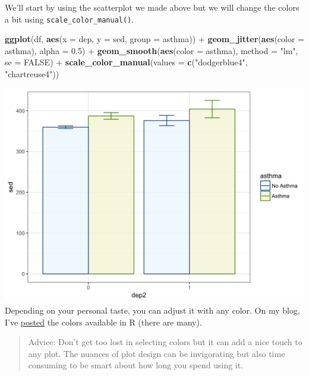 \documentclass[]{tufte-book}
\newenvironment{Shaded}{}{}
\newcommand{\KeywordTok}[1]{\textcolor[rgb]{0.00,0.44,0.13}{\textbf{#1}}}
\newcommand{\DataTypeTok}[1]{\textcolor[rgb]{0.56,0.13,0.00}{#1}}
\newcommand{\FloatTok}[1]{\textcolor[rgb]{0.25,0.63,0.44}{#1}}
\newcommand{\StringTok}[1]{\textcolor[rgb]{0.25,0.44,0.63}{#1}}
\newcommand{\OtherTok}[1]{\textcolor[rgb]{0.00,0.44,0.13}{#1}}
\newcommand{\OperatorTok}[1]{\textcolor[rgb]{0.40,0.40,0.40}{#1}}
\newcommand{\NormalTok}[1]{#1}
\theoremstyle{definition}
\theoremstyle{definition}
\theoremstyle{remark}
\begin{document}
We'll start by using the scatterplot we made above but we will change
the colors a bit using \texttt{scale\_color\_manual()}.

\begin{Shaded}
\begin{Highlighting}[]
\KeywordTok{ggplot}\NormalTok{(df, }\KeywordTok{aes}\NormalTok{(}\DataTypeTok{x =}\NormalTok{ dep, }\DataTypeTok{y =}\NormalTok{ sed, }\DataTypeTok{group =}\NormalTok{ asthma)) }\OperatorTok{+}\StringTok{ }
\StringTok{    }\KeywordTok{geom_jitter}\NormalTok{(}\KeywordTok{aes}\NormalTok{(}\DataTypeTok{color =}\NormalTok{ asthma), }\DataTypeTok{alpha =} \FloatTok{0.5}\NormalTok{) }\OperatorTok{+}\StringTok{ }
\StringTok{    }\KeywordTok{geom_smooth}\NormalTok{(}\KeywordTok{aes}\NormalTok{(}\DataTypeTok{color =}\NormalTok{ asthma), }\DataTypeTok{method =} \StringTok{"lm"}\NormalTok{, }
        \DataTypeTok{se =} \OtherTok{FALSE}\NormalTok{) }\OperatorTok{+}\StringTok{ }\KeywordTok{scale_color_manual}\NormalTok{(}\DataTypeTok{values =} \KeywordTok{c}\NormalTok{(}\StringTok{"dodgerblue4"}\NormalTok{, }
    \StringTok{"chartreuse4"}\NormalTok{))}
\end{Highlighting}
\end{Shaded}

\includegraphics{_main_files/figure-latex/unnamed-chunk-147-1} Depending
on your personal taste, you can adjust it with any color. On my blog,
I've \href{https:/tysonstanley.github.io}{posted} the colors available
in R (there are many).

\begin{quote}
Advice: Don't get too lost in selecting colors but it can add a nice
touch to any plot. The nuances of plot design can be invigorating but
also time consuming to be smart about how long you spend using it.
\end{quote}
\end{document}
